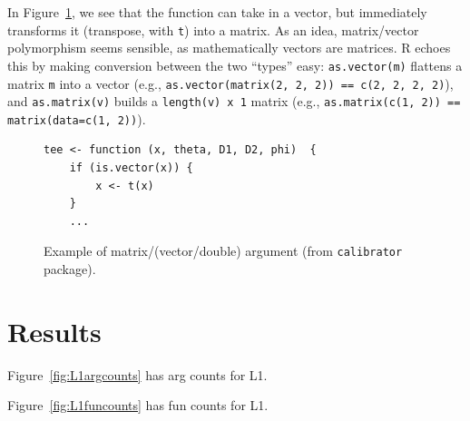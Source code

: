 \documentclass[acmsmall,10pt,review,anonymous]{acmart}\settopmatter{printfolios=true,printccs=false,printacmref=false}
\newcommand{\code}[1]{\lstinline|#1|\xspace}
\begin{document}
In Figure~\ref{fig:matvec}, we see that the function can take in a vector, but immediately transforms it (transpose, with {\tt t}) into a matrix.
As an idea, matrix/vector polymorphism seems sensible, as mathematically vectors are matrices.
R echoes this by making conversion between the two ``types'' easy:
\code{as.vector(m)} flattens a matrix \code{m} into a vector (e.g., \code{as.vector(matrix(2, 2, 2)) == c(2, 2, 2, 2)}), and \code{as.matrix(v)} builds a {\tt length(v) x 1} matrix (e.g., \code{as.matrix(c(1, 2)) == matrix(data=c(1, 2))}).

\begin{figure}[!hb]{\small\begin{lstlisting}[style=R]
tee <- function (x, theta, D1, D2, phi)  {
    if (is.vector(x)) {
        x <- t(x)
    }
    ...
\end{lstlisting}}\caption{Example of matrix/(vector/double) argument (from {\tt calibrator} package).}\label{fig:matvec}\end{figure}

%
%
%
%
%
%
\section{Results}\label{sec:results}


Figure~\ref{fig:L1argcounts} has arg counts for L1.

Figure~\ref{fig:L1funcounts} has fun counts for L1.
\end{document}
